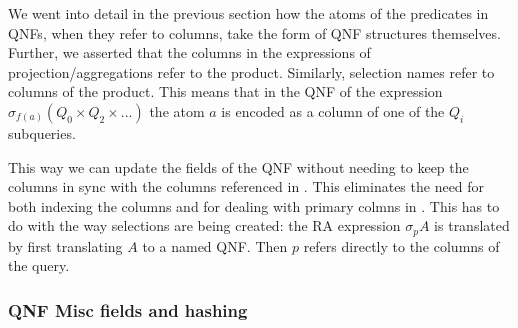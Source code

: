 We went into detail in the previous section how the atoms of the predicates in QNFs,
when they refer to columns, take the form of QNF structures themselves. Further, we asserted
that the columns in the expressions of projection/aggregations refer to the
product. Similarly, selection names refer to columns of the product.
This means that in the QNF of the expression \(\sigma_{f(a)} (Q_0 \times Q_2 \times ...)\) 
the atom \(a\) is encoded as a column of one of the \(Q_i\) subqueries.


This way we can update the fields of the QNF without needing
to keep the columns in sync with the columns referenced in
. This eliminates the need for both indexing the columns and
for dealing with primary colmns in . This has to do with
the way selections are being created: the RA expression \(\sigma_p A\)
is translated by first translating \(A\) to a named QNF. Then \(p\)
refers directly to the columns of the query.

\subsubsection{QNF Misc fields and hashing}

